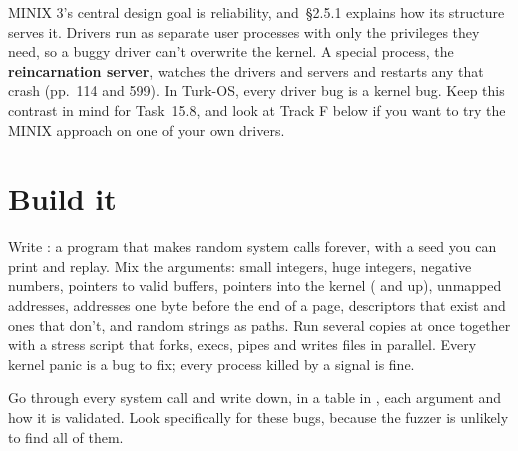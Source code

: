 \documentclass[11pt,a4paper]{article}
\begin{document}
\begin{minixbox}
MINIX 3's central design goal is reliability, and \OSDI\,\S2.5.1 explains how its structure serves it. Drivers run
as separate user processes with only the privileges they need, so a buggy driver can't overwrite the kernel. A
special process, the \textbf{reincarnation server}, watches the drivers and servers and restarts any that crash
(\OSDI pp.~114 and 599). In Turk-OS, every driver bug is a kernel bug. Keep this contrast in mind for Task~15.8, and
look at Track F below if you want to try the MINIX approach on one of your own drivers.
\end{minixbox}

\section{Build it}

Write : a program that makes random system calls forever, with a seed you can print and replay.
Mix the arguments: small integers, huge integers, negative numbers, pointers to valid buffers, pointers into the kernel
( and up), unmapped addresses, addresses one byte before the end of a page, descriptors that exist and
ones that don't, and random strings as paths. Run several copies at once together with a stress script that forks,
execs, pipes and writes files in parallel. Every kernel panic is a bug to fix; every process killed by a signal is
fine.

Go through every system call and write down, in a table in , each argument and how it is validated. Look
specifically for these bugs, because the fuzzer is unlikely to find all of them.
\end{document}
